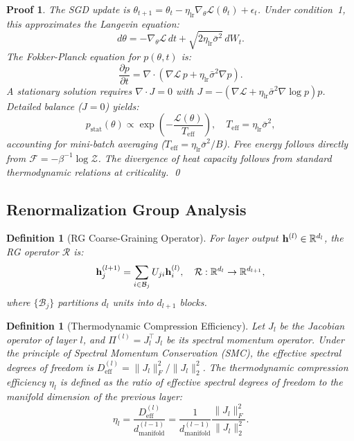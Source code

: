 \documentclass[11pt, a4paper]{article}
\newtheorem{dfn}[theo]{Definition}
\theoremstyle{plain}
\newtheorem*{pf}{Proof}
\def\R{{\mathbb R}}
\def\bfh{{\bf h}}
\def\sF{{\mathcal F}}
\def\sR{{\mathcal R}}
\def\sL{{\mathcal L}}
\def\sZ{{\mathcal Z}}
\begin{document}
\begin{pf}
The SGD update is $\theta_{t+1} = \theta_t - \eta_{\text{lr}}\nabla_\theta\sL(\theta_t) + \epsilon_t$. Under condition~1, this approximates the Langevin equation:
\begin{equation}
d\theta = -\nabla_\theta\sL\,dt + \sqrt{2\eta_{\text{lr}}\bar{\sigma}^2}\,dW_t.
\end{equation}
The Fokker-Planck equation for $p(\theta,t)$ is:
\begin{equation}
\frac{\partial p}{\partial t} = \nabla\!\cdot\!\left(\nabla\sL\, p + \eta_{\text{lr}}\bar{\sigma}^2\nabla p\right).
\end{equation}
A stationary solution requires $\nabla\!\cdot\!J = 0$ with $J = -(\nabla\sL + \eta_{\text{lr}}\bar{\sigma}^2\nabla\log p)p$. Detailed balance ($J=0$) yields:
\begin{equation}
p_{\text{stat}}(\theta) \propto \exp\!\left(-\frac{\sL(\theta)}{T_{\text{eff}}}\right), \quad T_{\text{eff}} = \eta_{\text{lr}}\bar{\sigma}^2,
\end{equation}
accounting for mini-batch averaging ($T_{\text{eff}} = \eta_{\text{lr}}\bar{\sigma}^2/B$). Free energy follows directly from $\sF = -\beta^{-1}\log\sZ$. The divergence of heat capacity follows from standard thermodynamic relations at criticality.
\qed
\end{pf}

\subsection{Renormalization Group Analysis}

\begin{dfn}[RG Coarse-Graining Operator]\label{dfn:rg_operator}
For layer output $\bfh^{(l)} \in \R^{d_l}$, the RG operator $\sR$ is:
\begin{equation}
\bfh^{(l+1)}_j = \sum_{i \in \mathcal{B}_j} U_{ji} \bfh^{(l)}_i, \quad \sR: \R^{d_l} \to \R^{d_{l+1}},
\label{eq:rg_operator}
\end{equation}
where $\{\mathcal{B}_j\}$ partitions $d_l$ units into $d_{l+1}$ blocks.
\end{dfn}

\begin{dfn}[Thermodynamic Compression Efficiency]\label{dfn:compression_efficiency}
Let $J_l$ be the Jacobian operator of layer $l$, and $\Pi^{(l)} = J_l^\top J_l$ be its spectral momentum operator. Under the principle of Spectral Momentum Conservation (SMC), the effective spectral degrees of freedom is $D_{\text{eff}}^{(l)} = \|J_l\|_F^2 / \|J_l\|_2^2$. The thermodynamic compression efficiency $\eta_l$ is defined as the ratio of effective spectral degrees of freedom to the manifold dimension of the previous layer:
\begin{equation}
\eta_l = \frac{D_{\text{eff}}^{(l)}}{d_{\text{manifold}}^{(l-1)}} = \frac{1}{d_{\text{manifold}}^{(l-1)}} \frac{\|J_l\|_F^2}{\|J_l\|_2^2}.
\label{eq:eta_def}
\end{equation}
\end{dfn}
\end{document}
